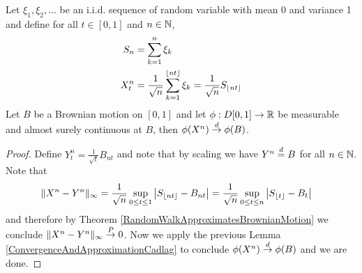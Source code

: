 \begin{thm}\label{DonskersTheorem}Let
  $\xi_1, \xi_2, \dotsc$ be an i.i.d. sequence of random variable with
  mean 0 and variance 1 and define for all $t \in [0,1]$ and $n \in \mathbb{N}$,
\begin{align*}
S_n &= \sum_{k=1}^n \xi_k \\
X^n_t &= \frac{1}{\sqrt{n}} \sum_{k=1}^{\lfloor nt \rfloor} \xi_k =
\frac{1}{\sqrt{n}} S_{\lfloor nt \rfloor}
\end{align*}
Let $B$ be a Brownian motion on $[0,1]$ and let $\phi : D[0,1] \to
\mathbb{R}$ be measurable and almost surely continuous at $B$, then
$\phi(X^n) \overset{d}\to \phi(B)$.
\end{thm}
\begin{proof}
Define $Y^n_t = \frac{1}{\sqrt{t}} B_{nt}$ and note that by scaling we
have $Y^n \overset{d}= B$ for all $n \in \mathbb{N}$.  Note that 
\begin{align*}
\lVert X^n - Y^n \rVert_\infty &= 
\frac{1}{\sqrt{n}} \sup_{0 \leq t \leq 1} \left \vert S_{\lfloor nt \rfloor} - B_{nt} \right \vert = 
\frac{1}{\sqrt{n}} \sup_{0 \leq t \leq n} \left \vert S_{\lfloor t \rfloor} - B_{t} \right \vert 
\end{align*}
and therefore by Theorem \ref{RandomWalkApproximatesBrownianMotion} we
conclude $\lVert X^n - Y^n \rVert_\infty \overset{P}\to 0$.  Now we apply the
previous Lemma \ref{ConvergenceAndApproximationCadlag} to conclude
$\phi(X^n) \overset{d}\to \phi(B)$ and we are done.
\end{proof}

